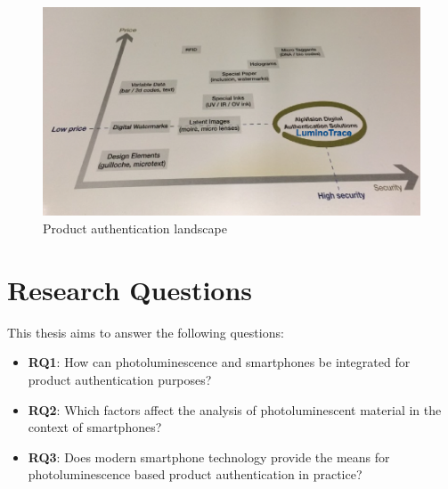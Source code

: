 \documentclass[thesis.tex]{subfiles}
\begin{document}
\begin{figure}[h!]
\centering \includegraphics[width=\linewidth]{images/landscape}
\caption{Product authentication landscape \label{fig:landscape}}
\end{figure}

\clearpage
\section{Research Questions}
\label{chapter:research-questions}

This thesis aims to answer the following questions:

\begin{itemize}
  \item \label{RQ1} \textbf{RQ1}: How can photoluminescence and smartphones be integrated for product authentication purposes?
  \item \label{RQ2} \textbf{RQ2}: Which factors affect the analysis of photoluminescent material in the context of smartphones?
  \item \label{RQ3} \textbf{RQ3}: Does modern smartphone technology provide the means for photoluminescence based product authentication in practice?
\end{itemize}
\end{document}

